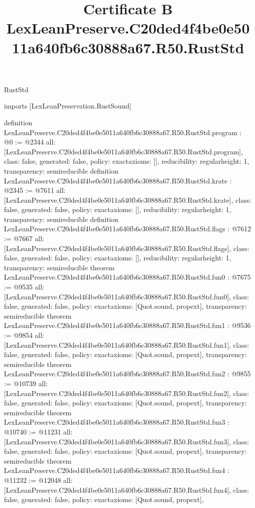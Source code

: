 \begin{lexlean}{RustStd}
\title{Certificate B LexLeanPreserve.C20ded4f4be0e5011a640fb6c30888a67.R50.RustStd}
\begin{coremodule}
imports [LexLeanPreservation.RustSound]

definition LexLeanPreserve.C20ded4f4be0e5011a640fb6c30888a67.R50.RustStd.program : @0 := @2344 {
  all: [LexLeanPreserve.C20ded4f4be0e5011a640fb6c30888a67.R50.RustStd.program],
  class: false,
  generated: false,
  policy: exact{axioms: []},
  reducibility: regular{height: 1},
  transparency: semireducible
}
definition LexLeanPreserve.C20ded4f4be0e5011a640fb6c30888a67.R50.RustStd.krate : @2345 := @7611 {
  all: [LexLeanPreserve.C20ded4f4be0e5011a640fb6c30888a67.R50.RustStd.krate],
  class: false,
  generated: false,
  policy: exact{axioms: []},
  reducibility: regular{height: 1},
  transparency: semireducible
}
definition LexLeanPreserve.C20ded4f4be0e5011a640fb6c30888a67.R50.RustStd.flags : @7612 := @7667 {
  all: [LexLeanPreserve.C20ded4f4be0e5011a640fb6c30888a67.R50.RustStd.flags],
  class: false,
  generated: false,
  policy: exact{axioms: []},
  reducibility: regular{height: 1},
  transparency: semireducible
}
theorem LexLeanPreserve.C20ded4f4be0e5011a640fb6c30888a67.R50.RustStd.fun0 : @7675 := @9535 {
  all: [LexLeanPreserve.C20ded4f4be0e5011a640fb6c30888a67.R50.RustStd.fun0],
  class: false,
  generated: false,
  policy: exact{axioms: [Quot.sound, propext]},
  transparency: semireducible
}
theorem LexLeanPreserve.C20ded4f4be0e5011a640fb6c30888a67.R50.RustStd.fun1 : @9536 := @9854 {
  all: [LexLeanPreserve.C20ded4f4be0e5011a640fb6c30888a67.R50.RustStd.fun1],
  class: false,
  generated: false,
  policy: exact{axioms: [Quot.sound, propext]},
  transparency: semireducible
}
theorem LexLeanPreserve.C20ded4f4be0e5011a640fb6c30888a67.R50.RustStd.fun2 : @9855 := @10739 {
  all: [LexLeanPreserve.C20ded4f4be0e5011a640fb6c30888a67.R50.RustStd.fun2],
  class: false,
  generated: false,
  policy: exact{axioms: [Quot.sound, propext]},
  transparency: semireducible
}
theorem LexLeanPreserve.C20ded4f4be0e5011a640fb6c30888a67.R50.RustStd.fun3 : @10740 := @11231 {
  all: [LexLeanPreserve.C20ded4f4be0e5011a640fb6c30888a67.R50.RustStd.fun3],
  class: false,
  generated: false,
  policy: exact{axioms: [Quot.sound, propext]},
  transparency: semireducible
}
theorem LexLeanPreserve.C20ded4f4be0e5011a640fb6c30888a67.R50.RustStd.fun4 : @11232 := @12048 {
  all: [LexLeanPreserve.C20ded4f4be0e5011a640fb6c30888a67.R50.RustStd.fun4],
  class: false,
  generated: false,
  policy: exact{axioms: [Quot.sound, propext]},
}
\end{coremodule}
\end{lexlean}
